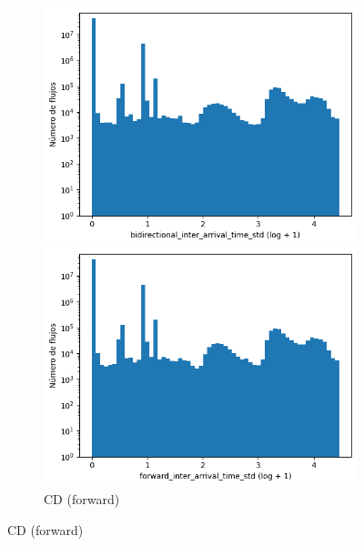 \begin{figure}[H]
    \centering
    \hfill
    \begin{subfigure}[b]{0.26\textwidth}
        \centering
        \includegraphics[width=\textwidth]{media/packet_pincer_cicddos/bidirectional_inter_arrival_time_std_log_x_log_y.png}
        \caption{CD (bidir.)}
        \includegraphics[width=\textwidth]{media/packet_pincer_cicddos/forward_inter_arrival_time_std_log_x_log_y.png}
        \caption{CD (forward)}

\end{subfigure}
\end{figure}
